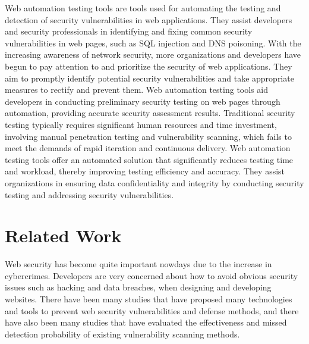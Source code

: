 \documentclass[journal]{IEEEtran}
\begin{document}
Web automation testing tools are tools used for automating the testing and detection of security vulnerabilities in web applications. They assist developers and security professionals in identifying and fixing common security vulnerabilities in web pages, such as SQL injection and DNS poisoning. With the increasing awareness of network security, more organizations and developers have begun to pay attention to and prioritize the security of web applications. They aim to promptly identify potential security vulnerabilities and take appropriate measures to rectify and prevent them. Web automation testing tools aid developers in conducting preliminary security testing on web pages through automation, providing accurate security assessment results. Traditional security testing typically requires significant human resources and time investment, involving manual penetration testing and vulnerability scanning, which fails to meet the demands of rapid iteration and continuous delivery. Web automation testing tools offer an automated solution that significantly reduces testing time and workload, thereby improving testing efficiency and accuracy. They assist organizations in ensuring data confidentiality and integrity by conducting security testing and addressing security vulnerabilities.

\section{Related Work}
\noindent Web security has become quite important nowdays due to the increase in cybercrimes. Developers are very concerned about how to avoid obvious security issues such as hacking and data breaches, when designing and developing websites. There have been many studies that have proposed many technologies and tools to prevent web security vulnerabilities and defense methods, and there have also been many studies that have evaluated the effectiveness and missed detection probability of existing vulnerability scanning methods. 
\end{document}

